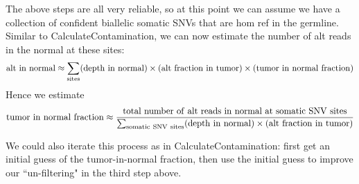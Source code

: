 \documentclass[nofootinbib,amssymb,amsmath]{revtex4}
\begin{document}
The above steps are all very reliable, so at this point we can assume we have a collection of confident biallelic somatic SNVs that are hom ref in the germline.  Similar to CalculateContamination, we can now estimate the number of alt reads in the normal at these sites:
\begin{align}
{\rm alt~in~normal} \approx \sum_{\rm sites} ({\rm depth~in~normal}) \times ({\rm alt~fraction~in~tumor}) \times ({\rm tumor~in~normal~fraction})
\end{align}
Hence we estimate
\begin{align}
{\rm tumor~in~normal~fraction} \approx 
\frac{\rm total~number~of~alt~reads~in~normal~at~somatic~SNV~sites}
{\sum_{\rm somatic~SNV~sites} ({\rm depth~in~normal}) \times ({\rm alt~fraction~in~tumor})}
\end{align}

We could also iterate this process as in CalculateContamination: first get an initial guess of the tumor-in-normal fraction, then use the initial guess to improve our ``un-filtering" in the third step above.
\end{document}
